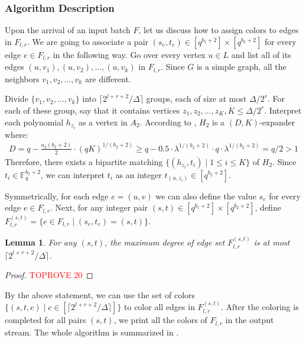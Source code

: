 \documentclass[11pt,a4paper]{article}
\newtheorem{lemma}{Lemma}[section]
\newcommand{\ceil}[1]{\lceil #1 \rceil}
\newcommand{\field}{\mathbb{F}}
\begin{document}
\subsubsection{Algorithm Description}
Upon the arrival of an input batch $F$, let us discuss how to assign colors to edges in $F_{l, r}$. We are going to associate a pair $(s_e, t_e)\in [q^{b_1+2}]\times [q^{b_2+2}]$ for every edge $e\in F_{l, r}$ in the following way. Go over every vertex $u\in L$ and list all of its edges $(u, v_1), (u, v_2), \ldots, (u, v_k)$ in $F_{l, r}$. Since $G$ is a simple graph, all the neighbors $v_1, v_2, \ldots, v_k$ are different. 

Divide $\{v_1, v_2, \ldots, v_k\}$ into $\ceil{2^{l+r+2} / \Delta}$ groups, each of size at most $\Delta / 2^r$. For each of these group, say that it contains vertices $z_1, z_2, \ldots, z_K, K\leq \Delta / 2^r$. Interpret each polynomial $h_{z_i}$ as a vertex in $A_2$. According to , $H_2$ is a $(D, K)$-expander where:
$$\begin{aligned}
	D = q - \frac{a_2(b_2+2)}{2}\cdot (qK)^{1 / (b_2+2)}
	\geq q - 0.5\cdot \lambda^{1 / (b_2+2)}\cdot q\cdot \lambda^{1 / (b_2+2)} = q/2 >1
\end{aligned}$$
Therefore, there exists a bipartite matching $\{(h_{z_i}, t_i)\mid 1\leq i\leq K\}$ of $H_2$. Since $t_i\in \field_q^{b_2+2}$, we can interpret $t_i$ as an integer $t_{(u, z_i)}\in [q^{b_2+2}]$.

Symmetrically, for each edge $e = (u, v)$ we can also define the value $s_e$ for every edge $e\in F_{l, r}$. Next, for any integer pair $(s, t)\in [q^{b_1+2}]\times [q^{b_2+2}]$, define $F_{l, r}^{(s, t)} = \{e\in F_{l, r}\mid (s_e, t_e) = (s, t)\}$.
\begin{lemma}
	For any $(s,  t)$, the maximum degree of edge set $F_{l, r}^{(s, t)}$ is at most $\ceil{2^{l+r+2} / \Delta}$.
\end{lemma}
\begin{proof}\textcolor{red}{TOPROVE 20}\end{proof}

By the above statement, we can use the set of colors $\{(s, t, c)\mid c\in [\ceil{2^{l+r+2} / \Delta}]\}$ to color all edges in $F_{l, r}^{(s, t)}$. After the coloring is completed for all pairs $(s, t)$, we print all the colors of $F_{l, r}$ in the output stream. The whole algorithm is summarized in .
\end{document}
